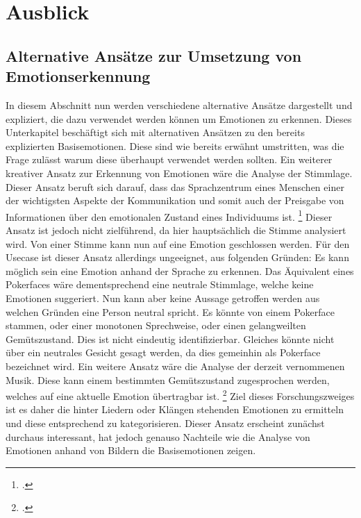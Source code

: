 \documentclass[12pt, a4paper]{scrbook}
\begin{document}
\chapter{Ausblick}

\section{Alternative Ansätze zur Umsetzung von Emotionserkennung}
In diesem Abschnitt nun werden verschiedene alternative Ansätze dargestellt und expliziert, die dazu verwendet werden können um Emotionen zu erkennen.
Dieses Unterkapitel beschäftigt sich mit alternativen Ansätzen zu den bereits explizierten Basisemotionen. Diese sind wie bereits erwähnt umstritten, was die Frage zulässt warum diese überhaupt
verwendet werden sollten. Ein weiterer kreativer Ansatz zur Erkennung von Emotionen wäre die Analyse der Stimmlage.
Dieser Ansatz beruft sich darauf, dass das Sprachzentrum eines Menschen einer der wichtigsten Aspekte der Kommunikation und somit auch der Preisgabe von Informationen über den emotionalen Zustand eines Individuums ist.
\footcite[Vgl. ][Abstract]{EmotionInSpeech}
Dieser Ansatz ist jedoch nicht zielführend, da hier hauptsächlich die Stimme analysiert wird. Von einer Stimme kann nun auf eine Emotion geschlossen werden. Für den Usecase ist dieser Ansatz allerdings ungeeignet, aus folgenden Gründen:\newline
Es kann möglich sein eine Emotion anhand der Sprache zu erkennen. Das Äquivalent eines Pokerfaces wäre dementsprechend eine neutrale Stimmlage, welche keine Emotionen suggeriert. Nun kann aber keine Aussage getroffen werden aus welchen Gründen eine Person neutral spricht. Es könnte von einem Pokerface stammen, oder einer monotonen Sprechweise, oder einen gelangweilten Gemütszustand. Dies ist nicht eindeutig identifizierbar. Gleiches könnte nicht über ein neutrales Gesicht gesagt werden, da dies gemeinhin als Pokerface bezeichnet wird. %
Ein weitere Ansatz wäre die Analyse der derzeit vernommenen Musik. Diese kann einem bestimmten Gemütszustand zugesprochen werden, welches auf eine aktuelle Emotion übertragbar ist.
\footcite[Vgl.][1]{MusicEmotion}
Ziel dieses Forschungszweiges ist es daher die hinter Liedern oder Klängen stehenden Emotionen zu ermitteln und diese entsprechend zu kategorisieren.
Dieser Ansatz erscheint zunächst durchaus interessant, hat jedoch genauso Nachteile wie die Analyse von Emotionen anhand von Bildern die Basisemotionen zeigen. %
\end{document}
